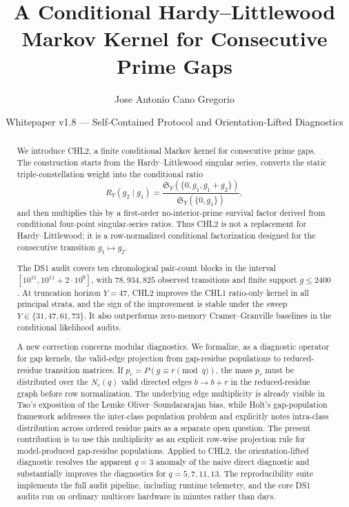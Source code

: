 \documentclass[10pt]{article}
\title{A Conditional Hardy--Littlewood Markov Kernel for Consecutive Prime Gaps}
\author{Jose Antonio Cano Gregorio}
\date{Whitepaper v1.8 --- Self-Contained Protocol and Orientation-Lifted Diagnostics}
\newcommand{\SY}{\mathfrak{S}_Y}
\begin{document}
\maketitle
\begin{abstract}
We introduce CHL2, a finite conditional Markov kernel for consecutive prime gaps.  The construction starts from the Hardy--Littlewood singular series, converts the static triple-constellation weight into the conditional ratio
\[
R_Y(g_2\mid g_1)=\frac{\SY(\{0,g_1,g_1+g_2\})}{\SY(\{0,g_1\})},
\]
and then multiplies this by a first-order no-interior-prime survival factor derived from conditional four-point singular-series ratios.  Thus CHL2 is not a replacement for Hardy--Littlewood; it is a row-normalized conditional factorization designed for the consecutive transition $g_1\mapsto g_2$.

The DS1 audit covers ten chronological pair-count blocks in the interval $[10^{11},10^{11}+2\cdot10^9]$, with $78{,}934{,}825$ observed transitions and finite support $g\le2400$.  At truncation horizon $Y=47$, CHL2 improves the CHL1 ratio-only kernel in all principal strata, and the sign of the improvement is stable under the sweep $Y\in\{31,47,61,73\}$.  It also outperforms zero-memory Cramer--Granville baselines in the conditional likelihood audits.

A new correction concerns modular diagnostics.  We formalize, as a diagnostic operator for gap kernels, the valid-edge projection from gap-residue populations to reduced-residue transition matrices.  If $p_r=P(g\equiv r\pmod q)$, the mass $p_r$ must be distributed over the $N_r(q)$ valid directed edges $b\to b+r$ in the reduced-residue graph before row normalization.  The underlying edge multiplicity is already visible in Tao's exposition of the Lemke Oliver--Soundararajan bias, while Holt's gap-population framework addresses the inter-class population problem and explicitly notes intra-class distribution across ordered residue pairs as a separate open question.  The present contribution is to use this multiplicity as an explicit row-wise projection rule for model-produced gap-residue populations.  Applied to CHL2, the orientation-lifted diagnostic resolves the apparent $q=3$ anomaly of the naive direct diagnostic and substantially improves the diagnostics for $q=5,7,11,13$.  The reproducibility suite implements the full audit pipeline, including runtime telemetry, and the core DS1 audits run on ordinary multicore hardware in minutes rather than days.

\end{abstract}
\tableofcontents
\listoffigures
\newpage
\end{document}
